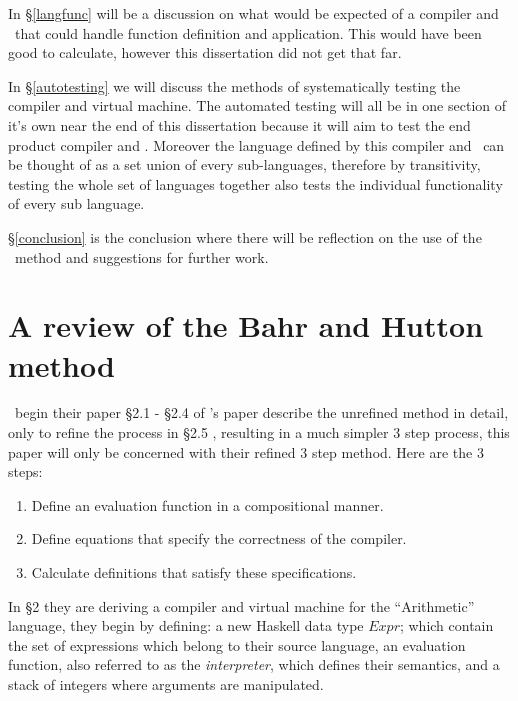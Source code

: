 \documentclass {article}
\begin{document}
In \S\ref{langfunc} will be a discussion on what
would be expected of a compiler and \vm\ that
could handle function definition and application.
This would have been good to calculate, however
this dissertation did not get that far.

In \S\ref{autotesting} we will discuss the methods
of systematically testing the compiler and virtual machine.
The automated testing will all be in one section of it's own
near the end of this dissertation
because it will aim to test the end product compiler and \vm.
Moreover the language defined by this compiler and \vm\
can be thought of as a set union of every sub-languages,
therefore by transitivity, testing 
the whole set of languages together
also tests the individual functionality of every sub language.

\S\ref{conclusion} is the conclusion where there will
be reflection on the use of the \BH\ method and suggestions
for further work.

\pagebreak
\section{A review of the Bahr and Hutton method} \label{bhrev}

\BH\ begin their paper \S2.1 - \S2.4 of \BH's paper describe the unrefined 
method in detail, only to refine the process
in \S2.5 \cite[Combining the transformation steps]{bandh},
resulting in a much simpler 3 step process, 
this paper will only be concerned with
their refined 3 step method\cite[page 12]{bandh}.
Here are the 3 steps:

\begin{enumerate}
	\item Define an evaluation function
		in a compositional manner.
	\item Define equations that specify
		the correctness of the compiler.
	\item Calculate definitions that 
		satisfy these specifications.
\end{enumerate}

In \S2 they are deriving a compiler
and virtual machine for the ``Arithmetic'' language,
they begin by defining: a new Haskell data type $Expr$;
which contain the set of expressions which belong to their source language,
an evaluation function, also referred to as the \emph{interpreter},
which defines their semantics,
and a stack of integers where 
arguments are manipulated.
\newcommand{\eval}{\textit{eval}}
\newcommand{\expr}{\textit{Expr}}
\newcommand{\val}{\textit{Val}}
\newcommand{\add}{\textit{Add}}
\newcommand{\code}{\textit{Code}}
\newcommand{\Val}{\mathit{Val\ }}
\newcommand{\Add}{\mathit{Add\ }}
\newcommand{\evalf}{\mathit{eval\ }}
\newcommand{\Expr}{\mathit{Expr\ }}
\newcommand{\Int}{\mathit{Int\ }}
\newcommand{\Code}{\mathit{Code\ }}
\end{document}
